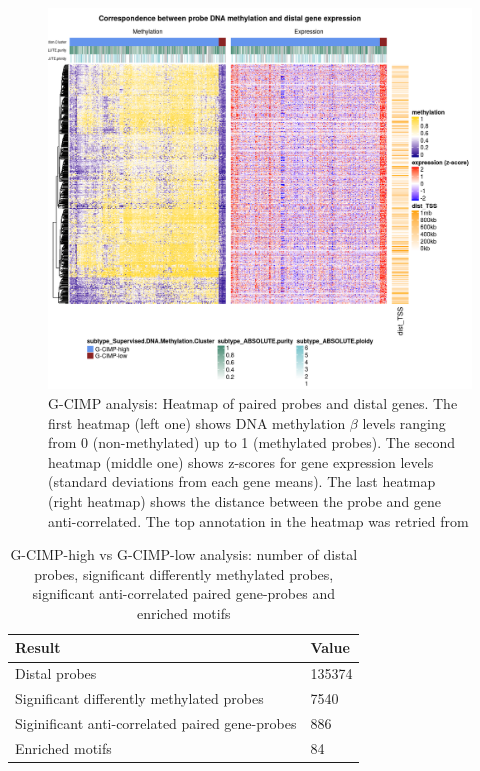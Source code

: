 \begin{center}
\begin{figure}[h!]

\includegraphics[width=16cm]{images/gcimp_heatmap.png}
\caption[G-CIMP analysis: Heatmap of paired probes and distal genes]{\label{fig:gcimpheatmap}G-CIMP analysis:
Heatmap of paired probes and distal genes. The first heatmap (left one) shows DNA methylation $\beta$ levels ranging from 0 (non-methylated) up to 1 (methylated probes).
The second heatmap (middle one) shows z-scores for gene expression levels (standard deviations from each gene means). The last heatmap (right heatmap) shows the distance between the probe
and gene anti-correlated. The top annotation in the heatmap was retried from }
\end{figure}

\end{center}

\begin{table}[h!]
\centering
\caption[G-CIMP analysis: Summary results]{G-CIMP-high vs G-CIMP-low analysis:
number of distal probes, significant differently methylated probes,
significant anti-correlated paired gene-probes and enriched motifs}
\label{gcimp.summary.results}
\begin{tabular}{@{}ll@{}}
\toprule
Result      & Value \\ \midrule
Distal probes       & 135374 \\
Significant differently methylated probes & 7540               \\
Siginificant anti-correlated paired gene-probes  & 886 \\
Enriched motifs & 84
\end{tabular}
\end{table}

